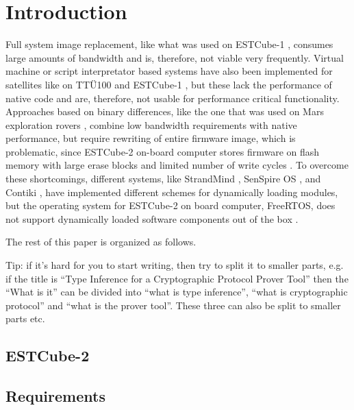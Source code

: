 \newpage
\section{Introduction}

Full system image replacement, like what was used on ESTCube-1 \cite{Tarbe2013,Suenter2016}, consumes large amounts of bandwidth and is, therefore, not viable very frequently. Virtual machine or script interpretator based systems have also been implemented for satellites like on TTÜ100 \cite{Aasavaeli2017} and ESTCube-1 \cite{Ehrpais2016}, but these lack the performance of native code and are, therefore, not usable for performance critical functionality. Approaches based on binary differences, like the one that was used on Mars exploration rovers \cite{Greco2005}, combine low bandwidth requirements with native performance, but require rewriting of entire firmware image, which is problematic, since ESTCube-2 on-board computer stores firmware on flash memory with large erase blocks and limited number of write cycles \cite{Haljaste2017}. To overcome these shortcomings, different systems, like StrandMind \cite{Bridges2013}, SenSpire OS \cite{Dong2009}, and Contiki \cite{Dunkels2006}, have implemented different schemes for dynamically loading modules, but the operating system for ESTCube-2 on board computer, FreeRTOS, does not support dynamically loaded software components out of the box \cite{Barry2005}. 


The rest of this paper is organized as follows.

Tip: if it's hard for you to start writing, then try to split it to smaller parts, e.g. if the title is ``Type Inference for a Cryptographic Protocol Prover Tool'' then the ``What is it'' can be divided into ``what is type inference'', ``what is cryptographic protocol'' and ``what is the prover tool''. These three can also be split to smaller parts etc.

\subsection{ESTCube-2}

\subsection{Requirements}
